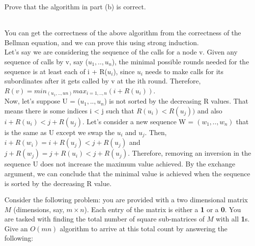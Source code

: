 \documentclass[solutionorbox,answers]{exam}
\begin{document}
\begin{questions}
\begin{parts}
\item Prove that the algorithm in part (b) is correct.
\begin{solutionbox}{} \vspace{1em} \\
You can get the correctness of the above algorithm from the correctness of the Bellman equation, and we can prove this using strong induction.\\
Let's say we are considering the sequence of the calls for a node v. Given any sequence of calls by v, say ($u_{1},..,u_{n}$), the minimal possible rounds needed for the sequence is at least each of i + R($u_{i}$), since $u_{i}$ needs to make calls for its subordinates after it gets called by v at the ith round. Therefore, $R(v) = min_{(u_{1},..,u{n})} max_{i=1,..,n}(i + R(u_{i}))$.\\
Now, let's suppose U = ($u_{1},..,u_{n}$) is not sorted by the decreasing R values. That means there is some indices i < j such that $R(u_{i}) < R(u_{j}))$ and also $i + R(u_{i}) < j + R(u_{j})$. Let's consider a new sequence W = $(w_{1},..,w_{n})$ that is the same as U except we swap the $u_{i}$ and $u_{j}$. Then, $i + R(w_{i}) = i + R(u_{j}) < j + R(u_{j})$ and $j + R(w_{j}) = j + R(u_{i}) < j + R(u_{j})$. Therefore, removing an inversion in the sequence U does not increase the maximum value achieved. By the exchange argument, we can conclude that the minimal value is achieved when the sequence is sorted by the decreasing R value.
\end{solutionbox}
\end{parts}

\newpage


\question 
Consider the following problem: you are provided with a two dimensional matrix $M$ (dimensions, say, $m \times n$). 
Each entry of the matrix is either a \textbf{1} or a \textbf{0}. 
You are tasked with finding the total number of square sub-matrices of $M$ with all \textbf{1}s. 
Give an $O(mn)$ algorithm to arrive at this total count by answering the following:


\end{questions}
\end{document}
